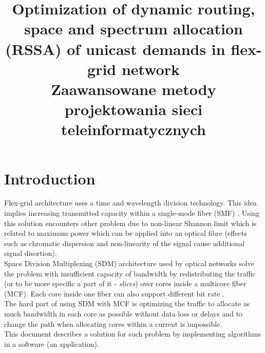 \documentclass[conference]{IEEEtran}
\begin{document}
\title{Optimization of dynamic routing, space and spectrum allocation
(RSSA) of unicast demands in flex-grid network\\
{\footnotesize \textsuperscript{} Zaawansowane metody projektowania sieci teleinformatycznych}
}

\author{
\and
{}
}

\maketitle

\section{Introduction}
Flex-grid architecture uses a time and wavelength division technology. This idea implies increasing transmitted capacity within a single-mode fiber (SMF) \cite{sdm-walko}. Using this solution encounters other problem due to non-linear Shannon limit which is related to maximum power which can be applied into an optical fibre (effects such as chromatic dispersion and non-linearity of the signal cause additional signal disortion)\cite{shannon}.
\\
Space Division Multiplexing (SDM) architecture used by optical networks solve the problem with insufficient capacity of bandwidth by redistributing the traffic (or to be more specific a part of it - \textit{slices}) over cores inside a multicore fiber (MCF). Each core inside one fiber can also support different bit rate \cite{flex-intro}.
\\
The hard part of using SDM with MCF is optimizing the traffic to allocate as much bandwidth in each core as possible without data loss or delays and to change the path when allocating cores within a current is impossible.
\\
This document describes a solution for such problem by implementing algorithms in a software (an application). 
\end{document}
